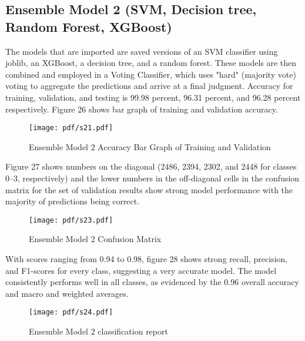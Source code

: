 \subsection {Ensemble Model 2 (SVM, Decision tree, Random Forest, XGBoost)}
The models that are imported are saved versions of an SVM classifier using joblib, an XGBoost, a decision tree, and a random forest. These models are then combined and employed in a Voting Classifier, which uses "hard" (majority vote) voting to aggregate the predictions and arrive at a final judgment. Accuracy for training, validation, and testing is 99.98 percent, 96.31 percent, and 96.28 percent respectively. Figure 26 shows bar graph of training and validation accuracy.
\begin{figure}[ht!]
  \raggedright
  \texttt{[image: pdf/s21.pdf]}
  \vspace{0pt}
  \caption{\textbf{ }Ensemble Model 2 Accuracy Bar Graph of Training and Validation}
\end{figure}

Figure 27 shows numbers on the diagonal (2486, 2394, 2302, and 2448 for classes 0–3, respectively) and the lower numbers in the off-diagonal cells in the confusion matrix for the set of validation results show strong model performance with the majority of predictions being correct.

\begin{figure}[ht!]
  \raggedright
  \texttt{[image: pdf/s23.pdf]}
  \vspace{0pt}
  \caption{\textbf{ }Ensemble Model 2 Confusion Matrix
  }
\end{figure}
With scores ranging from 0.94 to 0.98, figure 28 shows strong recall, precision, and F1-scores for every class, suggesting a very accurate model. The model consistently performs well in all classes, as evidenced by the 0.96 overall accuracy and macro and weighted averages.
\begin{figure}[ht!]
  \raggedright
  \texttt{[image: pdf/s24.pdf]}
  \vspace{0pt}
  \caption{\textbf{ }Ensemble Model 2 classification report}
\end{figure}


